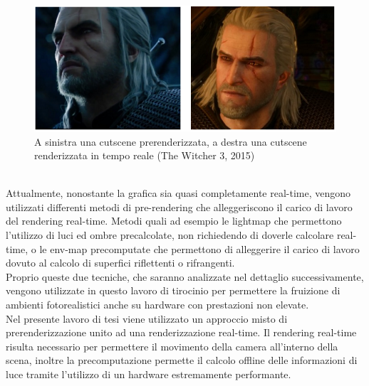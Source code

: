 \\
\begin{figure}[htb]
 \centering
 \includegraphics[width=1\linewidth]{images/chapter_stato_arte/stato_arte_tw.png}\hfill
 \caption[Confronto tra cutscene moderne prerenderizzate e real time]{A sinistra una cutscene prerenderizzata, a destra una cutscene renderizzata in tempo reale (The Witcher 3,  2015)}
 \label{fig:stato_arte_cutscenes}
\end{figure}
\\
Attualmente, nonostante la grafica sia quasi completamente real-time, vengono utilizzati differenti metodi di pre-rendering  che alleggeriscono il carico di lavoro del rendering real-time. Metodi quali ad esempio le lightmap che permettono l’utilizzo di luci ed ombre precalcolate, non richiedendo di doverle calcolare real-time, o le env-map precomputate che permettono di alleggerire il carico di lavoro dovuto al calcolo di superfici riflettenti o rifrangenti.
\\
Proprio queste due tecniche, che saranno analizzate nel dettaglio successivamente, vengono utilizzate in questo lavoro di tirocinio per permettere la fruizione di ambienti fotorealistici anche su hardware con prestazioni non elevate. 
\\
Nel presente lavoro di tesi viene utilizzato un approccio misto di prerenderizzazione unito ad una renderizzazione real-time.
Il rendering real-time risulta necessario per permettere il movimento della camera all’interno della scena, inoltre la precomputazione permette il calcolo offline delle informazioni di luce tramite l’utilizzo di un hardware estremamente performante.